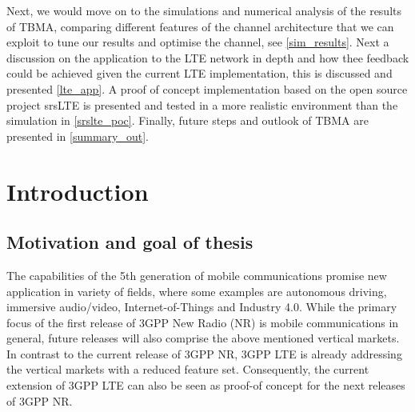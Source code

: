 \documentclass{article}
\begin{document}
Next, we would move on to the simulations and numerical analysis of the results of TBMA, comparing different features of the channel architecture that we can exploit to tune our results and optimise the channel, see \cref{sim_results}. Next a discussion on the application to the LTE network in depth and how thee feedback could be achieved given the current LTE implementation, this is discussed and presented \cref{lte_app}. A proof of concept implementation based on the open source project srsLTE is presented and tested in a more realistic environment than the simulation in \cref{srslte_poc}. Finally, future steps and outlook of TBMA are presented in \cref{summary_out}. 
\newpage

\section{Introduction}\label{intro}
\subsection{Motivation and goal of thesis}
The capabilities of the 5th generation of mobile communications promise new application in variety of
fields, where some examples are autonomous driving, immersive audio/video, Internet-of-Things and Industry 4.0. While the primary focus of the first release of 3GPP New Radio (NR) is mobile communications in general, future releases will also comprise the above mentioned vertical markets. In contrast to the current release of 3GPP NR, 3GPP LTE is already addressing the vertical markets with a reduced feature set. Consequently, the current extension of 3GPP LTE can also be seen as proof-of concept for the next releases of 3GPP NR.
\end{document}
